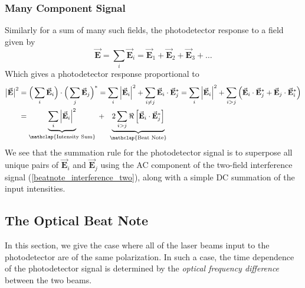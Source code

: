 \subsubsection{Many Component Signal}
Similarly for a sum of many such fields, the photodetector response to a field given by
\begin{equation}
	\vec{\mathbf{E}} = \sum_i \vec{\mathbf{E}}_i = \vec{\mathbf{E}}_1 + \vec{\mathbf{E}}_2 + \vec{\mathbf{E}}_3 + \ldots
\end{equation}
Which gives a photodetector response proportional to
\begin{align}\label{beatnote_interference_many}
	\big| \vec{\mathbf{E}} \big| ^2
	&= \Big(\sum_i \vec{\mathbf{E}}_i \Big) \cdot \Big(\sum_j \vec{\mathbf{E}}_j \Big)^*
	= \sum_i \left|\vec{\mathbf{E}}_i\right|^2 + \sum_{i \neq j} \vec{\mathbf{E}}_i \cdot \vec{\mathbf{E}}_j^*
	= \sum_i \left|\vec{\mathbf{E}}_i\right|^2 + \sum_{i > j} \Big( \vec{\mathbf{E}}_i \cdot \vec{\mathbf{E}}_j^* + \vec{\mathbf{E}}_j \cdot \vec{\mathbf{E}}_i^* \Big)
	\nonumber \\
	&= \underbrace{\sum_i \left|\vec{\mathbf{E}}_i\right|^2}_{\mathclap{\text{Intensity Sum}}}
	\; + \;\;
	\underbrace{2 \sum_{i > j} \Re \left[\vec{\mathbf{E}}_i \cdot \vec{\mathbf{E}}_j^*\right]}_{\mathclap{\text{Beat Note}}}
\end{align}
We see that the summation rule for the photodetector signal is to superpose all unique pairs of $\vec{\mathbf{E}}_i$ and $\vec{\mathbf{E}}_j$ using the AC component of the two-field interference signal (\ref{beatnote_interference_two}), along with a simple DC summation of the input intensities.

\subsection{The Optical Beat Note} \label{sec:beat_notes}
In this section, we give the case where all of the laser beams input to the photodetector are of the same polarization. In such a case, the time dependence of the photodetector signal is determined by the \textit{optical frequency difference} between the two beams.

